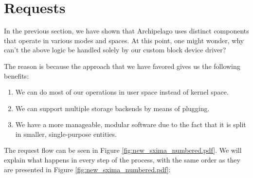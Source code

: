 \section{Requests}\label{sec:req-archip}

In the previous section, we have shown that Archipelago uses distinct 
components that operate in various modes and spaces. At this point, one might 
wonder, why can't the above logic be handled solely by our custom block device 
driver?

The reason is because the approach that we have favored gives us the following 
benefits:

\begin{enumerate}
	\item We can do most of our operations in user space instead of kernel 
		space.
	\item We can support multiple storage backends by means of plugging.
	\item We have a more manageable, modular software due to the fact that 
		it is split in smaller, single-purpose entities.
\end{enumerate}

The request flow can be seen in Figure \ref{fig:new_sxima_numbered.pdf}. We 
will explain what happens in every step of the process, with the same order as 
they are presented in Figure \ref{fig:new_sxima_numbered.pdf}:

